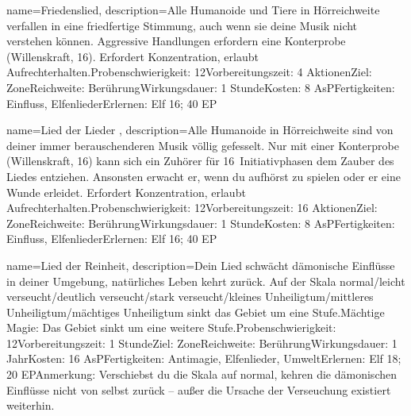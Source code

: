 {
    name={Friedenslied},
    description={Alle Humanoide und Tiere in Hörreichweite verfallen in eine friedfertige Stimmung, auch wenn sie deine Musik nicht verstehen können. Aggressive Handlungen erfordern eine Konterprobe (Willenskraft, 16). Erfordert Konzen­tration, erlaubt Aufrechterhalten.\newline Probenschwierigkeit: 12\newline Vorbereitungszeit: 4 Aktionen\newline Ziel: Zone\newline Reichweite: Berührung\newline Wirkungsdauer: 1 Stunde\newline Kosten: 8 AsP\newline Fertigkeiten: Einfluss, Elfenlieder\newline Erlernen: Elf 16; 40 EP}
}


{
    name={Lied der Lieder },
    description={Alle Humanoide in Hörreichweite sind von deiner immer berauschenderen Musik völlig gefesselt. Nur mit einer Konterprobe (Willenskraft, 16) kann sich ein Zuhörer für 16 Initiativphasen dem Zauber des Liedes entziehen. Ansonsten erwacht er, wenn du aufhörst zu spielen oder er eine Wunde erleidet. Erfordert Konzentration, erlaubt Aufrechterhalten.\newline Probenschwierigkeit: 12\newline Vorbereitungszeit: 16 Aktionen\newline Ziel: Zone\newline Reichweite: Berührung\newline Wirkungsdauer: 1 Stunde\newline Kosten: 8 AsP\newline Fertigkeiten: Einfluss, Elfenlieder\newline Erlernen: Elf 16; 40 EP}
}


{
    name={Lied der Reinheit},
    description={Dein Lied schwächt dämonische Einflüsse in deiner Umgebung, natürliches Leben kehrt zurück. Auf der Skala normal/leicht verseucht/deutlich verseucht/stark verseucht/kleines Unheiligtum/mittleres Unheiligtum/mächtiges Unheiligtum sinkt das Gebiet um eine Stufe.\newline Mächtige Magie: Das Gebiet sinkt um eine weitere Stufe.\newline Probenschwierigkeit: 12\newline Vorbereitungszeit: 1 Stunde\newline Ziel: Zone\newline Reichweite: Berührung\newline Wirkungsdauer: 1 Jahr\newline Kosten: 16 AsP\newline Fertigkeiten: Antimagie, Elfenlieder, Umwelt\newline Erlernen: Elf 18; 20 EP\newline Anmerkung: Verschiebst du die Skala auf normal, kehren die dämonischen Einflüsse nicht von selbst zurück – außer die Ursache der Verseuchung existiert weiterhin. }
}



